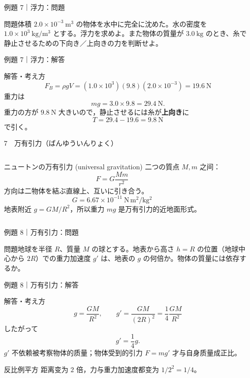 \documentclass[notheorems,aspectratio=169]{beamer}
\newcommand{\key}[1]{\textbf{\color{ChinaRed}#1}}
\newcommand{\en}[1]{\textcolor{GraphGray}{\scriptsize(#1)}}
\newcommand{\qcard}[1]{%
  \begin{block}{問題}\centering\large #1\end{block}}
\newcommand{\acard}[1]{%
  \begin{exampleblock}{解答・考え方}#1\end{exampleblock}}
\newcommand{\forcearrow}[5]{%
  \draw[-{Latex[length=3mm]},very thick,#5] (#1,#2)--++(#3,#4);}
\begin{document}
\begin{frame}{例題 7｜浮力：問題}
\vfill
\qcard{体積 $2.0\times10^{-3}\ \mathrm{m^3}$ の物体を水中に完全に沈めた。水の密度を $1.0\times10^3\ \mathrm{kg/m^3}$ とする。浮力を求めよ。また物体の質量が $3.0\ \mathrm{kg}$ のとき、糸で静止させるための下向き／上向きの力を判断せよ。}
\vfill
\end{frame}

\begin{frame}{例題 7｜浮力：解答}
\acard{
\[
F_B=\rho gV=(1.0\times10^3)(9.8)(2.0\times10^{-3})=\boxed{19.6\ \mathrm N}
\]
重力は
\[
mg=3.0\times9.8=29.4\ \mathrm N.
\]
重力の方が $9.8\ \mathrm N$ 大きいので，静止させるには糸が\key{上向き}に
\[
\boxed{T=29.4-19.6=9.8\ \mathrm N}
\]
で引く。}
\end{frame}

\begin{frame}{7　万有引力（ばんゆういんりょく）}
\begin{columns}[c]
\begin{block}{ニュートンの万有引力 \en{universal gravitation}}
二つの質点 $M,m$ 之间：
\[
F=G\frac{Mm}{r^2}
\]
方向は二物体を結ぶ直線上、互いに引き合う。
\[
G=6.67\times10^{-11}\ \mathrm{N\,m^2/kg^2}
\]
地表附近 $g=GM/R^2$，所以重力 $mg$ 是万有引力的近地面形式。
\end{block}
\centering
{}
\end{columns}
\end{frame}

\begin{frame}{例題 8｜万有引力：問題}
\vfill
\qcard{地球を半径 $R$、質量 $M$ の球とする。地表から高さ $h=R$ の位置（地球中心から $2R$）での重力加速度 $g'$ は、地表の $g$ の何倍か。物体の質量には依存するか。}
\vfill
\end{frame}

\begin{frame}{例題 8｜万有引力：解答}
\acard{
\[
g=\frac{GM}{R^2},\qquad
g'=\frac{GM}{(2R)^2}=\frac14\frac{GM}{R^2}
\]
したがって
\[
\boxed{g'=\frac14g}.
\]
$g'$ 不依赖被考察物体的质量；物体受到的引力 $F=mg'$ 才与自身质量成正比。}
\begin{alertblock}{反比例平方}
距离变为 $2$ 倍，力与重力加速度都变为 $1/2^2=1/4$。
\end{alertblock}
\end{frame}
\end{document}
